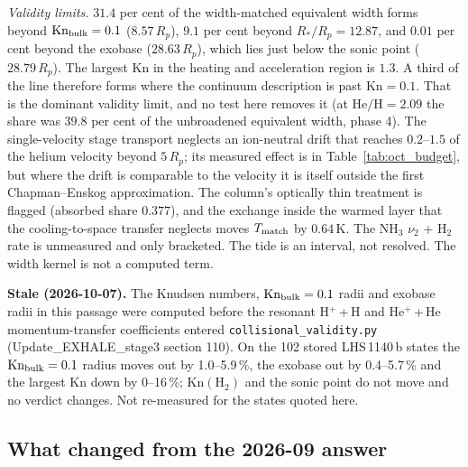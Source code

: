 \documentclass[english,a4paper]{my_memo}
\begin{document}
\noindent\emph{Validity limits.} $31.4$ per cent of the width-matched
equivalent width forms beyond $\mathrm{Kn}_{\rm bulk} = 0.1$
($8.57\,R_p$), $9.1$ per cent beyond $R_*/R_p = 12.87$, and $0.01$ per cent
beyond the exobase ($28.63\,R_p$), which lies just below the sonic point
($28.79\,R_p$). The largest Kn in the heating and acceleration region is
$1.3$. A third of the line therefore forms where the continuum description
is past $\mathrm{Kn} = 0.1$. That is the dominant validity limit, and no
test here removes it (at $\mathrm{He/H} = 2.09$ the share was $39.8$ per
cent of the unbroadened equivalent width, phase 4). The single-velocity stage transport neglects an
ion-neutral drift that reaches $0.2$--$1.5$ of the helium velocity beyond
$5\,R_p$; its measured effect is in Table~\ref{tab:oct_budget}, but where
the drift is comparable to the velocity it is itself outside the first
Chapman--Enskog approximation. The column's optically thin treatment is
flagged (absorbed share $0.377$), and the exchange inside the warmed layer
that the cooling-to-space transfer neglects moves $T_{\rm match}$ by
$0.64$\,K. The NH$_3$ $\nu_2$ + H$_2$ rate is unmeasured and only
bracketed. The tide is an interval, not resolved. The width kernel is not
a computed term.

\noindent\textbf{Stale (2026-10-07).} The Knudsen numbers, $\mathrm{Kn}_{\rm bulk}=0.1$ radii and exobase radii in this passage were computed before the resonant H$^+$\,+\,H and He$^+$\,+\,He momentum-transfer coefficients entered \texttt{collisional\_validity.py} (Update\_EXHALE\_stage3 section 110). On the 102 stored LHS\,1140\,b states the $\mathrm{Kn}_{\rm bulk}=0.1$ radius moves out by 1.0--5.9\,\%, the exobase out by 0.4--5.7\,\% and the largest Kn down by 0--16\,\%; $\mathrm{Kn}(\mathrm{H_2})$ and the sonic point do not move and no verdict changes. Not re-measured for the states quoted here.

\subsection{What changed from the 2026-09 answer}
\label{sec:oct_change}
\end{document}
